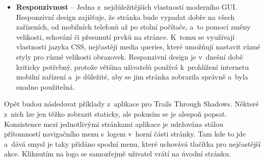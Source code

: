 \begin{itemize}
  \item \textbf{Responzivnost} -- Jedna z~nejdůležitějších vlastností moderního GUI. Responzivní design zajišťuje, že stránka bude vypadat dobře na všech zařízeních, od mobilních telefonů až po stolní počítače, a~to pomocí změny velikosti, schování či přesunutí prvků na stránce. K~tomu se využívají vlastnosti jazyka CSS, nejčastěji media queries, které umožňují nastavit různé styly pro různé velikosti obrazovek. Responzivní design je v~dnešní době kriticky potřebný, protože většina uživatelů používá k~prohlížení internetu mobilní zařízení a~je důležité, aby se jim stránka zobrazila správně a~byla snadno použitelná.
\end{itemize}

Opět budou následovat příklady z~aplikace pro Trails Through Shadows. Některé z~nich lze jen těžko zobrazit staticky, ale pokusím se je alespoň popsat. Konzistence mezi jednotlivými stránkami aplikace je udržována stálou přítomností navigačního menu s~logem v~horní části stránky. Tam kde to jde a~dává smysl je taky přidáno spodní menu, které uchovává tlačítka pro nejčastější akce. Kliknutím na logo se samozřejmě uživatel vrátí na úvodní stránku.

